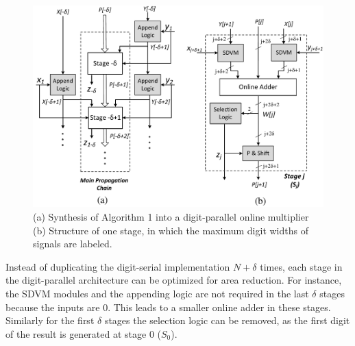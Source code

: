 \documentclass{acm_proc_article-sp}
\begin{document}
\begin{figure}[tbp]
\centering
\includegraphics[width=.49\textwidth]{./Figures/OnlineMult_Unrolled.pdf}
\vspace{-4ex}
\caption{(a) Synthesis of Algorithm 1 into a digit-parallel online multiplier (b) Structure of one stage, in which the maximum digit widths of signals are labeled.}
\vspace{-2ex}
\label{Fig:Radix2OnlineMultiplier}
\end{figure}

Instead of duplicating the digit-serial implementation $N+\delta$ times, each stage in the digit-parallel architecture can be optimized for area reduction. For instance, the SDVM modules and the appending logic are not required in the last $\delta$ stages because the inputs are 0. This leads to a smaller online adder in these stages. Similarly for the first $\delta$ stages the selection logic can be removed, as the first digit of the result is generated at stage 0 ($S_0$).
\end{document}
